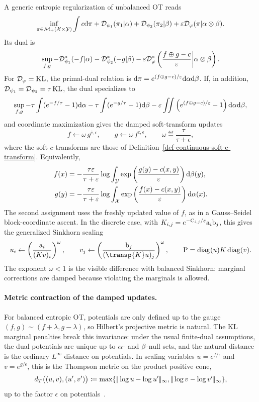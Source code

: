 A generic entropic regularization of unbalanced OT reads
\begin{equation}\label{eq-unbalanced-entropic-primal}
	\inf_{\pi\in\mathcal{M}_+(\mathcal{X}\times\mathcal{Y})}
	\int c\mathrm{d}\pi
	+
	\mathcal{D}_{\psi_1}(\pi_1|\alpha)
	+
	\mathcal{D}_{\psi_2}(\pi_2|\beta)
	+
	\varepsilon\mathcal{D}_\varphi(\pi|\alpha\otimes\beta).
\end{equation}
Its dual is
\[
	\sup_{f,g}
	-
	\mathcal{D}_{\psi_1}^*(-f|\alpha)
	-
	\mathcal{D}_{\psi_2}^*(-g|\beta)
	-
	\varepsilon\mathcal{D}_\varphi^*\left(\frac{f\oplus g-c}{\varepsilon}\middle|\alpha\otimes\beta\right).
\]
For $\mathcal{D}_\varphi=\operatorname{KL}$, the primal-dual relation is $\mathrm{d}\pi=e^{(f\oplus g-c)/\varepsilon}\mathrm{d}\alpha\mathrm{d}\beta$. If, in addition, $\mathcal{D}_{\psi_1}=\mathcal{D}_{\psi_2}=\tau\operatorname{KL}$, the dual specializes to
\[
	\sup_{f,g}
	-\tau\int(e^{-f/\tau}-1)\mathrm{d}\alpha
	-\tau\int(e^{-g/\tau}-1)\mathrm{d}\beta
	-\varepsilon\iint
	\left(e^{(f\oplus g-c)/\varepsilon}-1\right)
	\mathrm{d}\alpha\mathrm{d}\beta,
\]
and coordinate maximization gives the damped soft-transform updates
\[
	f \leftarrow \omega\, g^{\bar c,\epsilon},
	\qquad
	g \leftarrow \omega\, f^{c,\epsilon},
	\qquad
	\omega\eqdef\frac{\tau}{\tau+\epsilon},
\]
where the soft $c$-transforms are those of Definition~\ref{def-continuous-soft-c-transform}. Equivalently,
\begin{align*}
	f(x)
	&=
	-
	\frac{\tau\varepsilon}{\tau+\varepsilon}
	\log\int_{\mathcal{Y}}
	\exp\left(\frac{g(y)-c(x,y)}{\varepsilon}\right)\mathrm{d}\beta(y),\\
	g(y)
	&=
	-
	\frac{\tau\varepsilon}{\tau+\varepsilon}
		\log\int_{\mathcal{X}}
		\exp\left(\frac{f(x)-c(x,y)}{\varepsilon}\right)\mathrm{d}\alpha(x).
\end{align*}
The second assignment uses the freshly updated value of $f$, as in a
Gauss--Seidel block-coordinate ascent.
In the discrete case, with $K_{i,j}=e^{-\mathrm{C}_{i,j}/\varepsilon}\mathrm{a}_i\mathrm{b}_j$, this gives the generalized Sinkhorn scaling
\[
	u_i\leftarrow \left(\frac{\a_i}{(K v)_i}\right)^\omega,
	\qquad
	v_j\leftarrow \left(\frac{\b_j}{(\transp{K}u)_j}\right)^\omega,
	\qquad
	\P=\diag(u)K\diag(v).
\]
The exponent $\omega<1$ is the visible difference with balanced Sinkhorn: marginal corrections are damped because violating the marginals is allowed.

\paragraph{Metric contraction of the damped updates.}
For balanced entropic OT, potentials are only defined up to the gauge
$(f,g)\sim(f+\lambda,g-\lambda)$, so Hilbert's projective metric is natural.
The KL marginal penalties break this invariance: under the usual finite-dual
assumptions, the dual potentials are unique up to $\alpha$- and $\beta$-null sets,
and the natural distance is the ordinary $L^\infty$ distance on potentials. In
scaling variables $u=e^{f/\epsilon}$ and $v=e^{g/\epsilon}$, this is the
Thompson metric on the product positive cone,
\[
	d_T\big((u,v),(u',v')\big)
	\coloneqq
	\max\{|\!| \log u-\log u' |\!|_\infty,|\!| \log v-\log v' |\!|_\infty\},
\]
up to the factor $\epsilon$ on potentials~\cite{lemmens2012nonlinear}.

